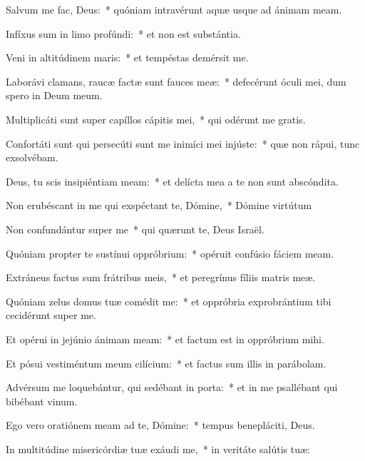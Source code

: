 \item Salvum me fac, Deus:~* quóniam intravérunt aquæ usque ad ánimam meam.

\item Infíxus sum in limo profúndi:~* et non est substántia.

\item Veni in altitúdinem maris:~* et tempéstas demérsit me.

\item Laborávi clamans, raucæ factæ sunt fauces meæ:~* defecérunt óculi mei, dum spero in Deum meum.

\item Multiplicáti sunt super capíllos cápitis mei,~* qui odérunt me gratis.

\item Confortáti sunt qui persecúti sunt me inimíci mei injúste:~* quæ non rápui, tunc exsolvébam.

\item Deus, tu scis insipiéntiam meam:~* et delícta mea a te non sunt abscóndita.

\item Non erubéscant in me qui exspéctant te, Dómine,~* Dómine virtútum

\item Non confundántur super me~* qui quærunt te, Deus Israël.

\item Quóniam propter te sustínui oppróbrium:~* opéruit confúsio fáciem meam.

\item Extráneus factus sum frátribus meis,~* et peregrínus fíliis matris meæ.

\item Quóniam zelus domus tuæ comédit me:~* et oppróbria exprobrántium tibi cecidérunt super me.

\item Et opérui in jejúnio ánimam meam:~* et factum est in oppróbrium mihi.

\item Et pósui vestiméntum meum cilícium:~* et factus sum illis in parábolam.

\item Advérsum me loquebántur, qui sedébant in porta:~* et in me psallébant qui bibébant vinum.

\item Ego vero oratiónem meam ad te, Dómine:~* tempus benepláciti, Deus.

\item In multitúdine misericórdiæ tuæ exáudi me,~* in veritáte salútis tuæ:

